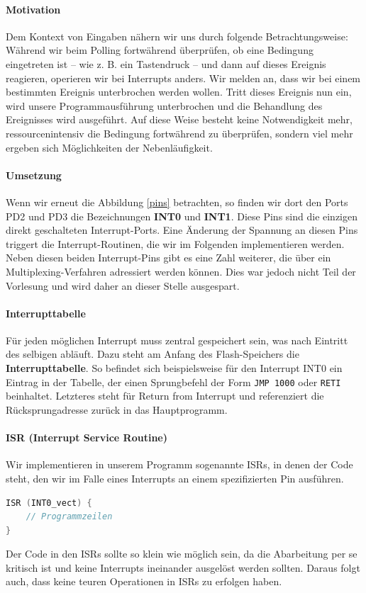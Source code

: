 \documentclass[11pt,a4paper]{scrartcl}
\begin{document}
\paragraph{Motivation}
Dem Kontext von Eingaben nähern wir uns durch folgende Betrachtungsweise:
Während wir beim Polling fortwährend überprüfen, ob eine Bedingung eingetreten ist -- wie z. B. ein Tastendruck -- und dann auf dieses Ereignis reagieren, operieren wir bei Interrupts anders. Wir melden an, dass wir bei einem bestimmten Ereignis unterbrochen werden wollen. Tritt dieses Ereignis nun ein, wird unsere Programmausführung unterbrochen und die Behandlung des Ereignisses wird ausgeführt. Auf diese Weise besteht keine Notwendigkeit mehr, ressourcenintensiv die Bedingung fortwährend zu überprüfen, sondern viel mehr ergeben sich Möglichkeiten der Nebenläufigkeit. 
\paragraph{Umsetzung}
Wenn wir erneut die Abbildung \ref{pins} betrachten, so finden wir dort den Ports PD2 und PD3 die Bezeichnungen \textbf{INT0} und \textbf{INT1}. Diese Pins sind die einzigen direkt geschalteten Interrupt-Ports. Eine Änderung der Spannung an diesen Pins triggert die Interrupt-Routinen, die wir im Folgenden implementieren werden. Neben diesen beiden Interrupt-Pins gibt es eine Zahl weiterer, die über ein Multiplexing-Verfahren adressiert werden können. Dies war jedoch nicht Teil der Vorlesung und wird daher an dieser Stelle ausgespart. 
\paragraph{Interrupttabelle}
Für jeden möglichen Interrupt muss zentral gespeichert sein, was nach Eintritt des selbigen abläuft. Dazu steht am Anfang des Flash-Speichers die \textbf{Interrupttabelle}. So befindet sich beispielsweise für den Interrupt INT0 ein Eintrag in der Tabelle, der einen Sprungbefehl der Form \texttt{JMP 1000} oder \texttt{RETI} beinhaltet. Letzteres steht für {\glqq}Return from Interrupt{\grqq} und referenziert die Rücksprungadresse zurück in das Hauptprogramm.
\paragraph{ISR (Interrupt Service Routine)} Wir implementieren in unserem Programm sogenannte ISRs, in denen der Code steht, den wir im Falle eines Interrupts an einem spezifizierten Pin ausführen. 
\begin{lstlisting}[language=C]
ISR (INT0_vect) {
	// Programmzeilen
}
\end{lstlisting}
Der Code in den ISRs sollte so klein wie möglich sein, da die Abarbeitung per se kritisch ist und keine Interrupts ineinander ausgelöst werden sollten. Daraus folgt auch, dass keine teuren Operationen in ISRs zu erfolgen haben.
\end{document}
